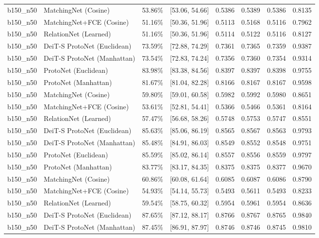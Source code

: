 \begin{table}[htbp]
\begin{tabular}{lllccccc}
b150\_n50 & MatchingNet (Cosine) & 53.86\% & [53.06, 54.66] & 0.5386 & 0.5389 & 0.5386 & 0.8135 \\
b150\_n50 & MatchingNet+FCE (Cosine) & 51.16\% & [50.36, 51.96] & 0.5113 & 0.5168 & 0.5116 & 0.7962 \\
b150\_n50 & RelationNet (Learned) & 51.16\% & [50.36, 51.96] & 0.5114 & 0.5122 & 0.5116 & 0.8127 \\
b150\_n50 & DeiT-S ProtoNet (Euclidean) & 73.59\% & [72.88, 74.29] & 0.7361 & 0.7365 & 0.7359 & 0.9387 \\
b150\_n50 & DeiT-S ProtoNet (Manhattan) & 73.54\% & [72.83, 74.24] & 0.7356 & 0.7360 & 0.7354 & 0.9314 \\
b150\_n50 & ProtoNet (Euclidean) & 83.98\% & [83.38, 84.56] & 0.8397 & 0.8397 & 0.8398 & 0.9755 \\
b150\_n50 & ProtoNet (Manhattan) & 81.67\% & [81.04, 82.28] & 0.8166 & 0.8167 & 0.8167 & 0.9598 \\
b150\_n50 & MatchingNet (Cosine) & 59.80\% & [59.01, 60.58] & 0.5982 & 0.5992 & 0.5980 & 0.8651 \\
b150\_n50 & MatchingNet+FCE (Cosine) & 53.61\% & [52.81, 54.41] & 0.5366 & 0.5466 & 0.5361 & 0.8164 \\
b150\_n50 & RelationNet (Learned) & 57.47\% & [56.68, 58.26] & 0.5748 & 0.5753 & 0.5747 & 0.8551 \\
b150\_n50 & DeiT-S ProtoNet (Euclidean) & 85.63\% & [85.06, 86.19] & 0.8565 & 0.8567 & 0.8563 & 0.9793 \\
b150\_n50 & DeiT-S ProtoNet (Manhattan) & 85.48\% & [84.91, 86.03] & 0.8549 & 0.8552 & 0.8548 & 0.9751 \\
b150\_n50 & ProtoNet (Euclidean) & 85.59\% & [85.02, 86.14] & 0.8557 & 0.8556 & 0.8559 & 0.9797 \\
b150\_n50 & ProtoNet (Manhattan) & 83.77\% & [83.17, 84.35] & 0.8375 & 0.8375 & 0.8377 & 0.9670 \\
b150\_n50 & MatchingNet (Cosine) & 60.86\% & [60.08, 61.64] & 0.6085 & 0.6087 & 0.6086 & 0.8790 \\
b150\_n50 & MatchingNet+FCE (Cosine) & 54.93\% & [54.14, 55.73] & 0.5493 & 0.5611 & 0.5493 & 0.8233 \\
b150\_n50 & RelationNet (Learned) & 59.54\% & [58.75, 60.32] & 0.5954 & 0.5961 & 0.5954 & 0.8636 \\
b150\_n50 & DeiT-S ProtoNet (Euclidean) & 87.65\% & [87.12, 88.17] & 0.8766 & 0.8767 & 0.8765 & 0.9840 \\
b150\_n50 & DeiT-S ProtoNet (Manhattan) & 87.45\% & [86.91, 87.97] & 0.8746 & 0.8746 & 0.8745 & 0.9810 \\
\hline
\end{tabular}
\end{table}
